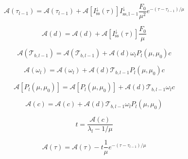 \begin{equation}
\mathcal{A}(\tau_{l-1}) = \mathcal{A}(\tau_{l-1}) + \mathcal{A}\left[I^{\downarrow}_{\mathrm{ss}}(\tau)\right] I^{\downarrow}_{\mathrm{ss,l-1}} \frac{F_{0}}{\mu^{2}} e^{-(\tau - \tau_{l-1}) / \mu}
\label{eq:single_scattering-adjoint_of_tangent_linear-down-tau_l_m_1_a}
\end{equation}

\begin{equation}
\mathcal{A}(d) = \mathcal{A}(d) + \mathcal{A}\left[I^{\downarrow}_{\mathrm{ss}}(\tau)\right] \frac{F_{0}}{\mu}
\label{eq:single_scattering-adjoint_of_tangent_linear-down-d_a}
\end{equation}

\begin{equation}
\mathcal{A}(\mathcal{T}_{b,l-1}) = \mathcal{A}(\mathcal{T}_{b,l-1}) + \mathcal{A}(d) \omega_{l} P_{l}(\mu, \mu_0) c
\label{eq:single_scattering-adjoint_of_tangent_linear-down-tau_l_m_1_a}
\end{equation}

\begin{equation}
\mathcal{A}(\omega_{l}) = \mathcal{A}(\omega_{l}) + \mathcal{A}(d) \mathcal{T}_{b,l-1} P_{l}(\mu, \mu_0) c
\label{eq:single_scattering-adjoint_of_tangent_linear-down-omega_l_a}
\end{equation}

\begin{equation}
\mathcal{A}\left[P_{l}(\mu, \mu_0)\right] = \mathcal{A}\left[P_{l}(\mu, \mu_0)\right] + \mathcal{A}(d) \mathcal{T}_{b,l-1} \omega_{l} c
\label{eq:single_scattering-adjoint_of_tangent_linear-down-p_l_a}
\end{equation}

\begin{equation}
\mathcal{A}(c) = \mathcal{A}(c) + \mathcal{A}(d) \mathcal{T}_{b,l-1} \omega_{l} P_{l}(\mu, \mu_0)
\label{eq:single_scattering-adjoint_of_tangent_linear-down-c_a}
\end{equation}

\begin{equation}
t = \frac{\mathcal{A}(c)}{\lambda_{l} - 1 / \mu}
\label{eq:single_scattering-adjoint_of_tangent_linear-down-t}
\end{equation}

\begin{equation}
\mathcal{A}(\tau) = \mathcal{A}(\tau) - t \frac{1}{\mu} e^{-(\tau - \tau_{l-1}) / \mu}
\label{eq:single_scattering-adjoint_of_tangent_linear-down-tau_a2}
\end{equation}

